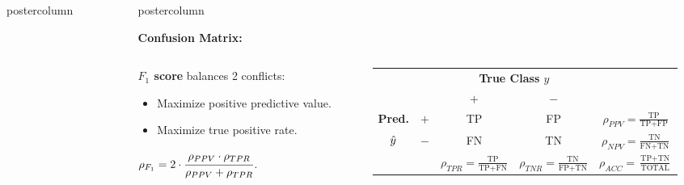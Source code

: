 \documentclass{beamer}
\newlength{\columnheight} %
\begin{document}
\begin{frame}[fragile]{}
\begin{columns}
\begin{column}{.31\textwidth}
\begin{beamercolorbox}[center]{postercolumn}
\begin{minipage}{.98\textwidth}
{  }
  \end{minipage}
  \end{beamercolorbox}
  \end{column}
  
  \begin{column}{.31\textwidth}
  \begin{beamercolorbox}[center]{postercolumn}
  \begin{minipage}{.98\textwidth}
  \parbox[t][\columnheight]{\textwidth}{

    \begin{myblock}{}
    \begin{codebox}
    \textbf{Confusion Matrix: }
  \end{codebox}
  \begin{columns} 
    \begin{column}{0.5\textwidth} 
      \textbf{$F_1$ score} balances 2 conflicts:
      \begin{itemize}[$\bullet$]
        \setlength{\itemindent}{+.3in}
        \item Maximize positive predictive value.
        \item Maximize true positive rate.
        \end{itemize}
        $\rho_{F_1} = 2 \cdot \cfrac{\rho_{PPV} \cdot \rho_{TPR}}{\rho_{PPV} + \rho_{TPR}}$.
    \end{column} 
    \begin{column}{0.5\textwidth} 
      \begin{center}
        \scriptsize
        \renewcommand{\arraystretch}{1.5}
        \begin{tabular}{cc||cc|c}
            & & \multicolumn{2}{c|}{\bfseries True Class $y$} & \\
            & & $+$ & $-$ & \\ 
            \hline \hline
            \bfseries Pred.     & $+$ & TP & FP & $\rho_{PPV} = \frac{\text{TP}}{\text{TP} + \text{FP}}$\\
                      $\hat{y}$ & $-$ & FN & TN & $\rho_{NPV} = \frac{\text{TN}}{\text{FN} + \text{TN}}$\\
            \hline
            & & $\rho_{TPR} = \frac{\text{TP}}{\text{TP} + \text{FN}}$ & $\rho_{TNR} = \frac{\text{TN}}{\text{FP} + \text{TN}}$ & $\rho_{ACC} = \frac{\text{TP}+ \text{TN}}{\text{TOTAL}}$
        \end{tabular}
        \renewcommand{\arraystretch}{1}
        \end{center}
    \end{column} 
    \end{columns} 


\end{myblock}}
\end{minipage}
\end{beamercolorbox}
\end{column}
\end{columns}
\end{frame}
\end{document}
